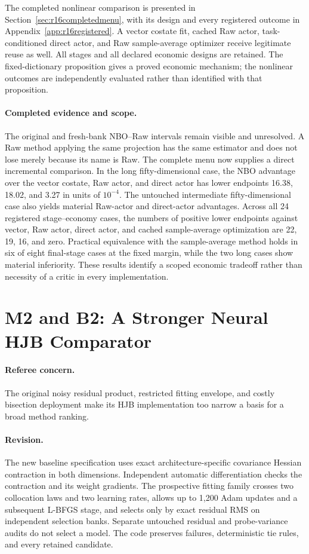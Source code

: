 The completed nonlinear comparison is presented in Section~\ref{sec:r16completedmenu}, with its design and every registered outcome in Appendix~\ref{app:r16registered}. A vector costate fit, cached Raw actor, task-conditioned direct actor, and Raw sample-average optimizer receive legitimate reuse as well. All stages and all declared economic designs are retained. The fixed-dictionary proposition gives a proved economic mechanism; the nonlinear outcomes are independently evaluated rather than identified with that proposition.

\paragraph*{Completed evidence and scope.} The original and fresh-bank NBO--Raw intervals remain visible and unresolved. A Raw method applying the same projection has the same estimator and does not lose merely because its name is Raw. The complete menu now supplies a direct incremental comparison. In the long fifty-dimensional case, the NBO advantage over the vector costate, Raw actor, and direct actor has lower endpoints 16.38, 18.02, and 3.27 in units of $10^{-4}$. The untouched intermediate fifty-dimensional case also yields material Raw-actor and direct-actor advantages. Across all 24 registered stage--economy cases, the numbers of positive lower endpoints against vector, Raw actor, direct actor, and cached sample-average optimization are 22, 19, 16, and zero. Practical equivalence with the sample-average method holds in six of eight final-stage cases at the fixed margin, while the two long cases show material inferiority. These results identify a scoped economic tradeoff rather than necessity of a critic in every implementation.

\section{M2 and B2: A Stronger Neural HJB Comparator}
\paragraph*{Referee concern.} The original noisy residual product, restricted fitting envelope, and costly bisection deployment make its HJB implementation too narrow a basis for a broad method ranking.

\paragraph*{Revision.} The new baseline specification uses exact architecture-specific covariance Hessian contraction in both dimensions. Independent automatic differentiation checks the contraction and its weight gradients. The prospective fitting family crosses two collocation laws and two learning rates, allows up to 1,200 Adam updates and a subsequent L-BFGS stage, and selects only by exact residual RMS on independent selection banks. Separate untouched residual and probe-variance audits do not select a model. The code preserves failures, deterministic tie rules, and every retained candidate.


